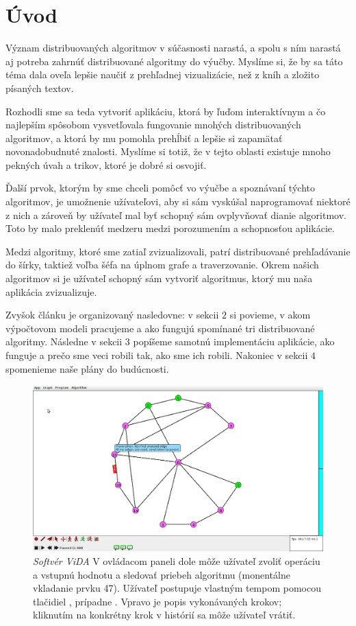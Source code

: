 \section{Úvod}

Význam distribuovaných algoritmov v súčasnosti narastá, a spolu s ním narastá aj potreba
zahrnúť distribuované algoritmy do výučby. Myslíme si, že by sa táto téma dala oveľa lepšie naučiť
z prehľadnej vizualizácie, než z kníh a zložito písaných textov.

Rozhodli sme sa teda vytvoriť aplikáciu, ktorá by ľuďom interaktívnym a čo najlepším spôsobom
vysvetľovala fungovanie mnohých distribuovaných algoritmov, a ktorá by mu pomohla prehĺbiť a lepšie si zapamätať
novonadobudnuté znalosti. Myslíme si totiž, že v tejto oblasti existuje mnoho pekných úvah a trikov,
ktoré je dobré si osvojiť. 

Ďalší prvok, ktorým by sme chceli pomôcť vo výučbe a spoznávaní týchto algoritmov, je umožnenie užívateľovi, 
aby si sám vyskúšal naprogramovať niektoré z nich a zároveň by užívateľ mal byť schopný sám
ovplyvňovať dianie algoritmov. Toto by malo preklenúť medzeru medzi porozumením a schopnosťou
aplikácie.

Medzi algoritmy, ktoré sme zatiaľ zvizualizovali, patrí distribuované prehľadávanie do šírky,
taktiež voľba šéfa na úplnom grafe a traverzovanie. Okrem našich algoritmov si je užívateľ schopný
sám vytvoriť algoritmus, ktorý mu naša aplikácia zvizualizuje.

Zvyšok článku je organizovaný nasledovne: v sekcii $2$ si povieme, v akom výpočtovom modeli
pracujeme a ako fungujú spomínané tri distribuované algoritmy. 
Následne v sekcii $3$ popíšeme samotnú implementáciu aplikácie, ako
funguje a prečo sme veci robili tak, ako sme ich robili. Nakoniec v sekcii $4$ spomenieme naše plány do budúcnosti.

\noindent
\begin{figure}
\centering
\includegraphics[width=2.01\columnwidth]{DFS.png}
\caption{\emph{Softvér ViDA} V ovládacom paneli dole môže užívateľ
zvoliť operáciu a vstupnú hodnotu a sledovať priebeh algoritmu (monentálne vkladanie
prvku 47). Užívateľ postupuje vlastným tempom  pomocou tlačidiel , prípadne
. Vpravo je popis vykonávaných krokov; kliknutím na konkrétny krok v histórií
sa môže užívateľ vrátiť.}
\label{img:historia} 
\end{figure}

